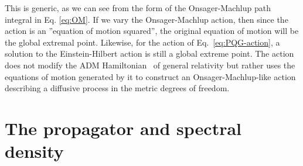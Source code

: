 \documentclass[aps,preprintnumbers,superscriptaddress,longbibliography]{revtex4-1}
\begin{document}
This is generic, as we can see from the form of the Onsager-Machlup path integral in Eq. \eqref{eq:OM}. If we vary the Onsager-Machlup action, then since the action is an ''equation of motion squared'', the original equation of motion will be the global extremal point. 
Likewise, for the action of 
Eq.~\eqref{eq:PQG-action}, a solution to the Einstein-Hilbert action is still a global extreme point. The action does not modify the ADM Hamiltonian~\cite{arnowitt2008republication} of general relativity but rather uses the equations of motion generated by it to construct an Onsager-Machlup-like action describing a diffusive process in the metric degrees of freedom.

\section{The propagator and spectral density}
\label{sec:propagator}
\end{document}
